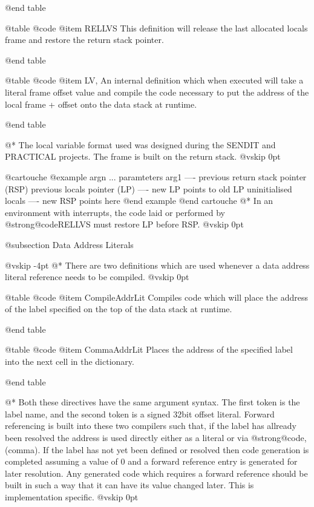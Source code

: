 @end table



@table @code
@item RELLVS
This definition will release the last allocated locals
 frame and restore the return stack pointer.

@end table



@table @code
@item LV,
An internal definition which when executed will take
 a literal frame offset value and compile the code
 necessary to put the address of the local frame + offset
 onto the data stack at runtime.

@end table

@*
The local variable format used was designed during the SENDIT
and PRACTICAL projects. The frame is built on the return stack.
@vskip 0pt

@cartouche
@example
argn
...        paramteters
arg1
----
previous return stack pointer (RSP)
previous locals pointer (LP)
---- new LP points to old LP
uninitialised locals
---- new RSP points here @end example
@end cartouche
@*
In an environment with interrupts, the code laid or performed
by @strong{@code{RELLVS}} must restore LP before RSP.
@vskip 0pt

@subsection Data Address Literals


@vskip -4pt
@*
There are two definitions which are used whenever a data address
literal reference needs to be compiled.
@vskip 0pt


@table @code
@item CompileAddrLit
Compiles code which will place the address of
 the label specified on the top of the data stack
 at runtime.

@end table



@table @code
@item CommaAddrLit
Places the address of the specified label into
 the next cell in the dictionary.

@end table

@*
Both these directives have the same argument syntax. The first
token is the label name, and the second token is a signed 32bit
offset literal. Forward referencing is built into these two
compilers such that, if the label has allready been resolved the
address is used directly either as a literal or via @strong{@code{,}}
(comma). If the label has not yet been defined or resolved
then code generation is completed assuming a value of 0 and
a forward reference entry is generated for later resolution.
Any generated code which requires a forward reference should
be built in such a way that it can have its value changed
later. This is implementation specific.
@vskip 0pt

